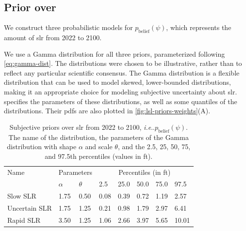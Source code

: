 \documentclass{agujournal2019}
\makeatletter
\DeclareRobustCommand\onedot{\futurelet\@let@token\@onedot}
\def\@onedot{\ifx\@let@token.\else.\null\fi\xspace}
\def\ie{\emph{i.e}\onedot} \def\Ie{\emph{I.e}\onedot}
\makeatother
\begin{document}
\subsection{Prior over }\label{sec:case-priors}

We construct three probabilistic models for $p_\mathrm{belief}(\psi)$, which represents the amount of \gls{slr} from 2022 to 2100.

We use a Gamma distribution for all three priors, parameterized following \cref{eq:gamma-dist}.
The distributions were chosen to be illustrative, rather than to reflect any particular scientific consensus.
The Gamma distribution is a flexible distribution that can be used to model skewed, lower-bounded distributions, making it an appropriate choice for modeling subjective uncertainty about \gls{slr}.
 specifies the parameters of these distributions, as well as some quantiles of the distributions.
Their \glspl{pdf} are also plotted in \cref{fig:lsl-priors-weights}(A).

\begin{table}[ht]
  \centering
  \caption{
    Subjective priors over \gls{slr} from 2022 to 2100, \ie $p_\mathrm{belief}(\psi)$.
    The name of the distribution, the parameters of the Gamma distribution with shape $\alpha$ and scale $\theta$, and the 2.5, 25, 50, 75, and 97.5th percentiles (values in \si{ft}).
  }\label{tab:slr-priors}
  \begin{tabular}{llllllll}
    \toprule
    Name          & \multicolumn{2}{c}{Parameters} & \multicolumn{5}{c}{Percentiles (in \si{ft})}                                     \\
    \cmidrule(lr){2-3}
    \cmidrule(lr){4-8}
                  & $\alpha$                       & $\theta$                                     & 2.5  & 25.0 & 50.0 & 75.0 & 97.5  \\
    \midrule
    Slow SLR      & 1.75                           & 0.50                                         & 0.08 & 0.39 & 0.72 & 1.19 & 2.57  \\
    Uncertain SLR & 1.75                           & 1.25                                         & 0.21 & 0.98 & 1.79 & 2.97 & 6.41  \\
    Rapid SLR     & 3.50                           & 1.25                                         & 1.06 & 2.66 & 3.97 & 5.65 & 10.01 \\
    \bottomrule
  \end{tabular}
\end{table}
\end{document}
